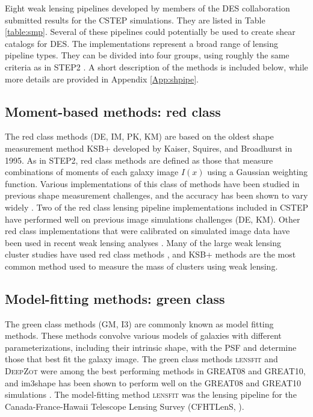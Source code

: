 Eight weak lensing pipelines developed by members of the DES collaboration submitted 
results for the CSTEP simulations. They are listed in Table \ref{table:smp}.
Several of these pipelines could potentially
be used to create shear catalogs for DES. The implementations
represent a broad range of lensing pipeline types. They can be divided
into four groups, using roughly the same criteria 
as in STEP2 \citep{STEP2}. A short description of the methods is
included below, while more details are provided in
Appendix \ref{App:shpipe}.\\

\subsection{Moment-based methods: red class}
The red class methods (DE, IM, PK, KM) are based on the oldest 
shape measurement method KSB+ developed by Kaiser, Squires, and Broadhurst in 1995. As in STEP2, red class methods are
defined as those that measure combinations of
moments of each galaxy image $I(x)$ using a Gaussian 
weighting function. Various implementations
of this class of methods have been studied in previous shape
measurement challenges, and the accuracy has been shown 
to vary widely \citep{STEP2, GREAT10}.  Two of the red class lensing
pipeline implementations included in CSTEP have performed well on
previous image simulations challenges (DE, KM). Other 
red class implementations that were calibrated on
simulated image data have been used in  recent 
weak lensing analyses \citep[e.g.][]{Gruen_s, Gruen14, Apple, TS}. Many of the
large weak lensing cluster studies have used red class
methods \citep{HH,VDLinden}, and KSB+ methods are the most common
method used to measure the mass of clusters using weak lensing.
 
\subsection{Model-fitting methods: green class}
The green class methods (GM, I3) are commonly known as model fitting
methods. These methods convolve various models of galaxies with different 
parameterizations, including their intrinsic shape, with the PSF and
determine those that best fit the galaxy image. The green class methods
\textsc{lensfit} and \textsc{DeepZot} were among the best performing 
methods in GREAT08 and GREAT10, and im3shape has been shown 
to perform well on the GREAT08 and GREAT10 simulations \citep{Jzun}. 
The model-fitting method \textsc{lensfit} was 
the lensing pipeline for the Canada-France-Hawaii 
Telescope Lensing Survey (CFHTLenS, \citealt{CHey}). 

